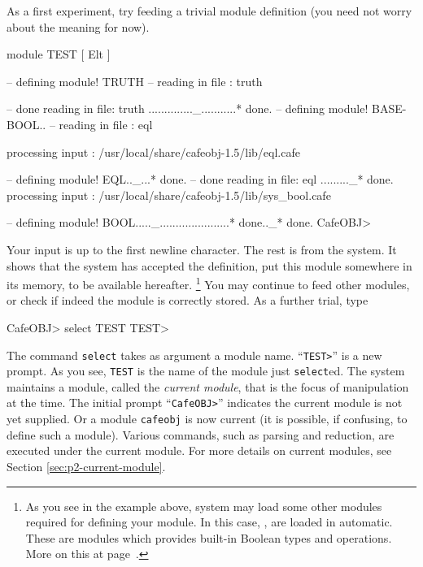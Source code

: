 \documentclass[a4paper]{memoir}
\begin{document}
As a first experiment, try feeding a trivial module definition
(you need not worry about the meaning for now).
\begin{vvtm}
\begin{ccode}
module TEST { [ Elt ] }

-- defining module! TRUTH
-- reading in file  : truth

-- done reading in file: truth
.............._...........* done.
-- defining module! BASE-BOOL..
-- reading in file  : eql

processing input : /usr/local/share/cafeobj-1.5/lib/eql.cafe

-- defining module! EQL.._...* done.
-- done reading in file: eql
........._* done.
processing input : /usr/local/share/cafeobj-1.5/lib/sys_bool.cafe

-- defining module! BOOL....._......................* done.._* done.
CafeOBJ> 
\end{ccode}
\end{vvtm}
Your input is up to the first newline character. The rest is from the
system. It shows that the system has accepted the definition, put
this module somewhere in its memory, to be available hereafter.
\footnote{As you see in the example above, system may load some other
modules required for defining your module. 
In this case, ,  are loaded in automatic.
These are modules which provides built-in Boolean types and
operations.
More on this at page~\pageref{sec:p2-import-decl}.}
You may continue to feed other modules, or check if indeed the module
is correctly stored. As a further trial, type
\begin{vvtm}
\begin{ccode}
  CafeOBJ> select TEST
  TEST>
\end{ccode}
\end{vvtm}
The command \texttt{select} takes as argument a module name.
``\verb|TEST>|'' is a new prompt. As you see, \verb|TEST| is the name
of the module just \texttt{select}ed. The system maintains
a module, called the \emph{current module},
that is the focus of manipulation at the time. The initial prompt
``\verb|CafeOBJ>|'' indicates the current module is not yet supplied.
Or a module \verb|cafeobj| is now current (it is possible, if confusing,
to define such a module).
Various commands, such as parsing and reduction, are executed under
the current module. For more details on current modules, see Section
\ref{sec:p2-current-module}.
\end{document}
